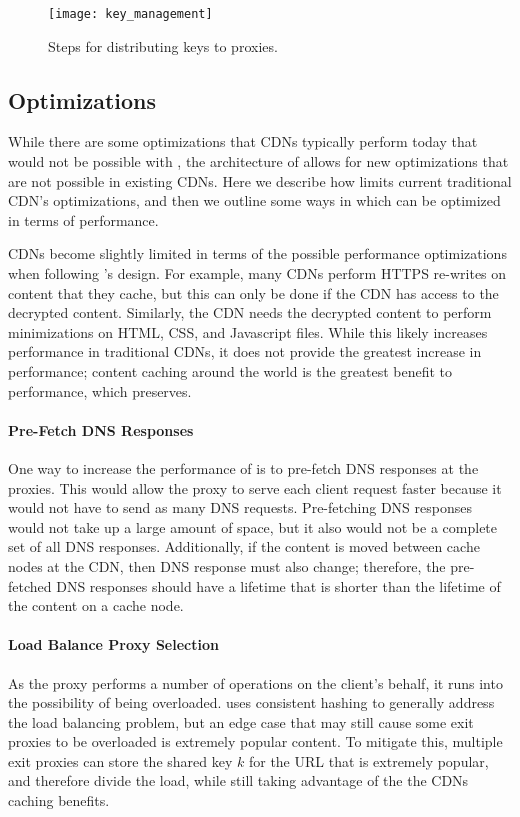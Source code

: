 \begin{figure}[t]
\centering
\texttt{[image: key\_management]}
\caption{Steps for distributing keys to proxies.}
\label{fig:keys}
\end{figure}

\subsection{Optimizations}
\label{sec:optimizations}
While there are some optimizations that CDNs typically perform today that would not be possible with \system{}, the architecture 
of \system{} allows for new optimizations that are not possible in existing CDNs.  Here we describe how \system{} limits 
current traditional CDN's optimizations, and then we outline some ways in which \system{} 
can be optimized in terms of performance.

CDNs become slightly limited in terms of the possible performance optimizations when following \system{}'s design.  For example, 
many CDNs perform HTTPS re-writes on content that they cache, but this can only be done if the CDN has access to the 
decrypted content.  Similarly, the CDN needs the decrypted content to perform minimizations on HTML, CSS, and Javascript 
files.  While this likely increases performance in traditional CDNs, it does not provide the greatest increase in performance; 
content caching around the world is the greatest benefit to performance, which \system{} preserves.

\paragraph{Pre-Fetch DNS Responses} One way to increase the performance of \system{} is to pre-fetch DNS responses at 
the proxies.  This would allow the proxy to serve each client request faster because it would not have to send 
as many DNS requests.  Pre-fetching DNS responses would not take up a large amount of space, but it also 
would not be a complete set of all DNS responses.  Additionally, if the content is moved between cache nodes 
at the CDN, then DNS response must also change; therefore, the pre-fetched DNS responses should have a 
lifetime that is shorter than the lifetime of the content on a cache node.

\paragraph{Load Balance Proxy Selection} As the proxy performs a number of operations on the client's behalf, it 
runs into the possibility of being overloaded.  \system{} uses consistent hashing to generally address the load balancing 
problem, but an edge case that may still cause some exit proxies to be overloaded is extremely popular content.  To mitigate this, 
multiple exit proxies can store the shared key $k$ for the URL that is extremely popular, and therefore divide the load, while 
still taking advantage of the the CDNs caching benefits.  

